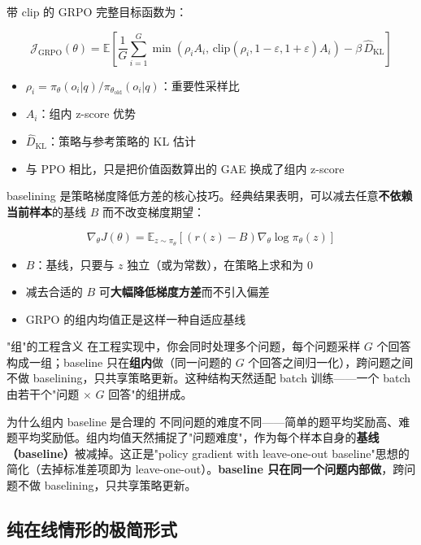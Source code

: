 \documentclass[a4paper]{article}
\begin{document}
带 clip 的 GRPO 完整目标函数为：

\[
\mathcal{J}_{\text{GRPO}}(\theta) = \mathbb{E}\left[ \frac{1}{G}\sum_{i=1}^{G} \min\!\left( \rho_i A_i,\, \text{clip}(\rho_i, 1-\varepsilon, 1+\varepsilon) A_i \right) - \beta\, \hat{D}_{\text{KL}} \right]
\]

\begin{itemize}
\item $\rho_i = \pi_\theta(o_i|q) / \pi_{\theta_{\text{old}}}(o_i|q)$：重要性采样比
\item $A_i$：组内 z-score 优势
\item $\hat{D}_{\text{KL}}$：策略与参考策略的 KL 估计
\item 与 PPO 相比，只是把价值函数算出的 GAE 换成了组内 z-score
\end{itemize}

baselining 是策略梯度降低方差的核心技巧。经典结果表明，可以减去任意\textbf{不依赖当前样本}的基线 $B$ 而不改变梯度期望：

\[
\nabla_\theta J(\theta) = \mathbb{E}_{z \sim \pi_\theta}\left[ \left( r(z) - B \right) \nabla_\theta \log \pi_\theta(z) \right]
\]

\begin{itemize}
\item $B$：基线，只要与 $z$ 独立（或为常数），在策略上求和为 0
\item 减去合适的 $B$ 可\textbf{大幅降低梯度方差}而不引入偏差
\item GRPO 的组内均值正是这样一种自适应基线
\end{itemize}

\begin{knowledgebox}{"组"的工程含义}
在工程实现中，你会同时处理多个问题，每个问题采样 $G$ 个回答构成一组；baseline 只在\textbf{组内}做（同一问题的 $G$ 个回答之间归一化），跨问题之间不做 baselining，只共享策略更新。这种结构天然适配 batch 训练——一个 batch 由若干个"问题 $\times$ $G$ 回答"的组拼成。
\end{knowledgebox}

\begin{importantbox}{为什么组内 baseline 是合理的}
不同问题的难度不同——简单的题平均奖励高、难题平均奖励低。组内均值天然捕捉了"问题难度"，作为每个样本自身的\textbf{基线（baseline）}被减掉。这正是"policy gradient with leave-one-out baseline"思想的简化（去掉标准差项即为 leave-one-out）。\textbf{baseline 只在同一个问题内部做}，跨问题不做 baselining，只共享策略更新。
\end{importantbox}

\subsection{纯在线情形的极简形式}
\end{document}
